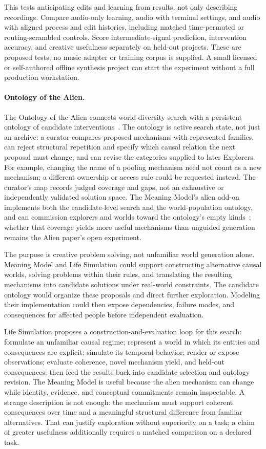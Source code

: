 \documentclass[10pt]{article}
\begin{document}
This tests anticipating edits and learning from results, not only describing
recordings. Compare audio-only learning, audio with terminal settings, and audio
with aligned process and edit histories, including matched time-permuted or
routing-scrambled controls. Score intermediate-signal prediction, intervention
accuracy, and creative usefulness separately on held-out projects. These are
proposed tests; no music adapter or training corpus is supplied. A small
licensed or self-authored offline synthesis project can start the experiment
without a full production workstation.

\paragraph{Ontology of the Alien.}
The Ontology of the Alien connects world-diversity search with a persistent
ontology of candidate interventions~\cite{westerbergOntology2026}. The ontology
is active search state, not just an archive: a curator compares proposed
mechanisms with represented families, can reject structural repetition and
specify which causal relation the next proposal must change, and can revise
the categories supplied to later Explorers. For example, changing the name of
a pooling mechanism need not count as a new mechanism; a different ownership
or access rule could be requested instead. The curator's map records judged
coverage and gaps, not an exhaustive or independently validated solution space.
The Meaning Model's alien add-on implements both the candidate-level search and
the world-population ontology, and can commission explorers and worlds toward
the ontology's empty kinds~\cite{westerbergMeaning2026}; whether that coverage
yields more useful mechanisms than unguided generation remains the Alien
paper's open experiment.

The purpose is creative problem solving, not unfamiliar world generation
alone. Meaning Model and Life Simulation could support constructing
alternative causal worlds, solving problems within their rules, and
translating the resulting mechanisms into candidate solutions under real-world
constraints. The candidate ontology would organize these proposals and direct
further exploration. Modeling their implementation could then expose
dependencies, failure modes, and consequences for affected people before
independent evaluation.

Life Simulation proposes a construction-and-evaluation loop for this search:
formulate an unfamiliar causal regime;
represent a world in which its entities and consequences are explicit; simulate
its temporal behavior; render or expose observations; evaluate coherence,
novel mechanism yield, and held-out consequences; then feed the results back
into candidate selection and ontology revision.
The Meaning Model is useful because the alien mechanism can change while
identity, evidence, and conceptual commitments remain inspectable. A strange
description is not enough: the mechanism must support coherent consequences
over time and a meaningful structural difference from familiar alternatives.
That can justify exploration without superiority on a task; a claim of greater
usefulness additionally requires a matched comparison on a declared task.
\end{document}
